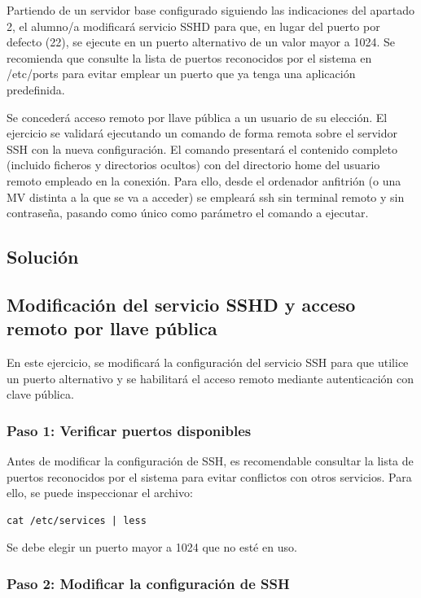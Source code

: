 Partiendo de un servidor base configurado siguiendo las indicaciones del apartado 2, el
alumno/a modificará servicio SSHD para que, en lugar del puerto por defecto (22), se ejecute en
un puerto alternativo de un valor mayor a 1024. Se recomienda que consulte la lista de puertos
reconocidos por el sistema en /etc/ports para evitar emplear un puerto que ya tenga una
aplicación predefinida.

Se concederá acceso remoto por llave pública a un usuario de su elección.
El ejercicio se validará ejecutando un comando de forma remota sobre el servidor SSH con la
nueva configuración. El comando presentará el contenido completo (incluido ficheros y
directorios ocultos) con del directorio home del usuario remoto empleado en la conexión. Para
ello, desde el ordenador anfitrión (o una MV distinta a la que se va a acceder) se empleará ssh
sin terminal remoto y sin contraseña, pasando como único como parámetro el comando a
ejecutar.

\subsection*{Solución}

\subsection*{Modificación del servicio SSHD y acceso remoto por llave pública}

En este ejercicio, se modificará la configuración del servicio SSH para que utilice un puerto alternativo y se habilitará el acceso remoto mediante autenticación con clave pública.

\subsubsection*{Paso 1: Verificar puertos disponibles}

Antes de modificar la configuración de SSH, es recomendable consultar la lista de puertos reconocidos por el sistema para evitar conflictos con otros servicios. Para ello, se puede inspeccionar el archivo:

\begin{lstlisting}[style=mystyle]
cat /etc/services | less
\end{lstlisting}

Se debe elegir un puerto mayor a 1024 que no esté en uso.

\subsubsection*{Paso 2: Modificar la configuración de SSH}

